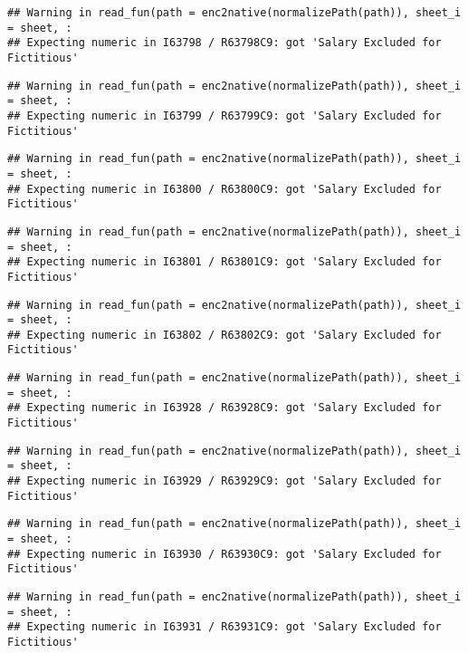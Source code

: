 \documentclass[
]{article}
\begin{document}
\begin{verbatim}
## Warning in read_fun(path = enc2native(normalizePath(path)), sheet_i = sheet, :
## Expecting numeric in I63798 / R63798C9: got 'Salary Excluded for Fictitious'
\end{verbatim}

\begin{verbatim}
## Warning in read_fun(path = enc2native(normalizePath(path)), sheet_i = sheet, :
## Expecting numeric in I63799 / R63799C9: got 'Salary Excluded for Fictitious'
\end{verbatim}

\begin{verbatim}
## Warning in read_fun(path = enc2native(normalizePath(path)), sheet_i = sheet, :
## Expecting numeric in I63800 / R63800C9: got 'Salary Excluded for Fictitious'
\end{verbatim}

\begin{verbatim}
## Warning in read_fun(path = enc2native(normalizePath(path)), sheet_i = sheet, :
## Expecting numeric in I63801 / R63801C9: got 'Salary Excluded for Fictitious'
\end{verbatim}

\begin{verbatim}
## Warning in read_fun(path = enc2native(normalizePath(path)), sheet_i = sheet, :
## Expecting numeric in I63802 / R63802C9: got 'Salary Excluded for Fictitious'
\end{verbatim}

\begin{verbatim}
## Warning in read_fun(path = enc2native(normalizePath(path)), sheet_i = sheet, :
## Expecting numeric in I63928 / R63928C9: got 'Salary Excluded for Fictitious'
\end{verbatim}

\begin{verbatim}
## Warning in read_fun(path = enc2native(normalizePath(path)), sheet_i = sheet, :
## Expecting numeric in I63929 / R63929C9: got 'Salary Excluded for Fictitious'
\end{verbatim}

\begin{verbatim}
## Warning in read_fun(path = enc2native(normalizePath(path)), sheet_i = sheet, :
## Expecting numeric in I63930 / R63930C9: got 'Salary Excluded for Fictitious'
\end{verbatim}

\begin{verbatim}
## Warning in read_fun(path = enc2native(normalizePath(path)), sheet_i = sheet, :
## Expecting numeric in I63931 / R63931C9: got 'Salary Excluded for Fictitious'
\end{verbatim}
\end{document}
